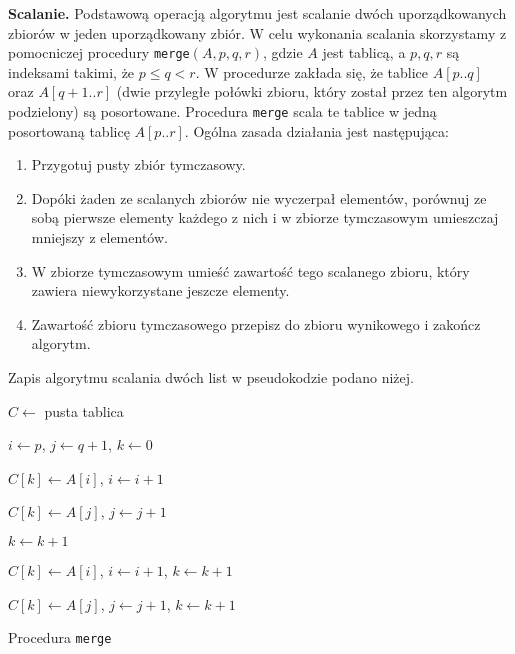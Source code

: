 \textbf{Scalanie.} Podstawową operacją algorytmu jest scalanie dwóch uporządkowanych zbiorów w jeden uporządkowany zbiór.
W celu wykonania scalania skorzystamy z pomocniczej procedury  \texttt{merge}$(A,p,q,r)$, gdzie $A$ jest tablicą, a $p, q, r$ są indeksami takimi, że $p \leq q < r$. 
W procedurze zakłada się, że tablice $A[p..q]$ oraz $A[q+1..r]$ (dwie przyległe połówki zbioru, który został przez ten algorytm podzielony) są posortowane. 
Procedura \texttt{merge} scala te tablice w jedną posortowaną tablicę $A[p..r]$. 
Ogólna zasada działania jest następująca:
\begin{enumerate}
\item Przygotuj pusty zbiór tymczasowy.
\item Dopóki żaden ze scalanych zbiorów nie wyczerpał elementów, porównuj ze sobą pierwsze elementy każdego z nich i w zbiorze tymczasowym umieszczaj mniejszy z elementów.
\item W zbiorze tymczasowym umieść zawartość tego scalanego zbioru, który zawiera niewykorzystane jeszcze elementy.
\item Zawartość zbioru tymczasowego przepisz do zbioru wynikowego i zakończ algorytm.
\end{enumerate}
Zapis algorytmu scalania dwóch list w pseudokodzie podano niżej.
\begin{algorithm}[h]

  \DontPrintSemicolon
  
  

  
  $C \leftarrow$ pusta tablica\;
  
  $i \leftarrow p$, $j \leftarrow q+1$, $k \leftarrow 0$\;
  
   {
  	 {
    	$C[k] \leftarrow A[i]$, $i \leftarrow i+1$\;
    } { 
    	$C[k] \leftarrow A[j]$, $j \leftarrow j+1$\;
    
    }
    $k \leftarrow k+1$\;
  
  }

   {
    $C[k] \leftarrow A[i]$, $i \leftarrow i+1$, $k \leftarrow k+1$\;
  }
  
   {
    $C[k] \leftarrow A[j]$, $j \leftarrow j+1$, $k \leftarrow k+1$\;
  }
  
  \caption{Procedura \texttt{merge}}
  \label{alg-merge}
\end{algorithm}

